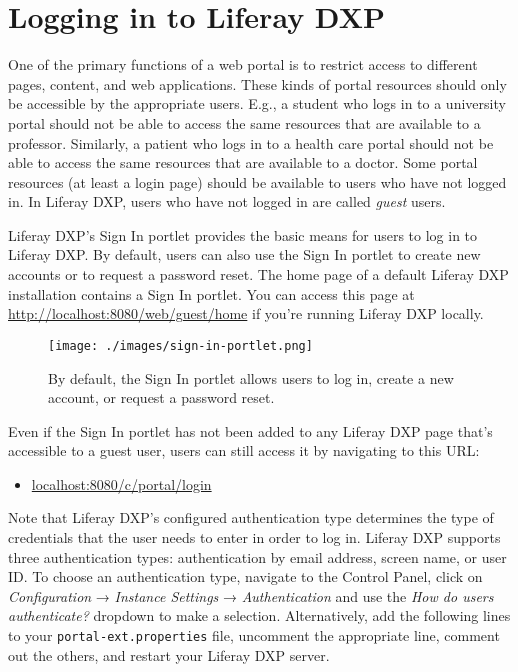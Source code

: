 \section{Logging in to Liferay DXP}\label{logging-in-to-liferay-dxp}

One of the primary functions of a web portal is to restrict access to
different pages, content, and web applications. These kinds of portal
resources should only be accessible by the appropriate users. E.g., a
student who logs in to a university portal should not be able to access
the same resources that are available to a professor. Similarly, a
patient who logs in to a health care portal should not be able to access
the same resources that are available to a doctor. Some portal resources
(at least a login page) should be available to users who have not logged
in. In Liferay DXP, users who have not logged in are called \emph{guest}
users.

Liferay DXP's Sign In portlet provides the basic means for users to log
in to Liferay DXP. By default, users can also use the Sign In portlet to
create new accounts or to request a password reset. The home page of a
default Liferay DXP installation contains a Sign In portlet. You can
access this page at \url{http://localhost:8080/web/guest/home} if you're
running Liferay DXP locally.

\begin{figure}
\centering
\texttt{[image: ./images/sign-in-portlet.png]}
\caption{By default, the Sign In portlet allows users to log in, create
a new account, or request a password reset.}
\end{figure}

Even if the Sign In portlet has not been added to any Liferay DXP page
that's accessible to a guest user, users can still access it by
navigating to this URL:

\begin{itemize}
\tightlist
\item
  \url{localhost:8080/c/portal/login}
\end{itemize}

Note that Liferay DXP's configured authentication type determines the
type of credentials that the user needs to enter in order to log in.
Liferay DXP supports three authentication types: authentication by email
address, screen name, or user ID. To choose an authentication type,
navigate to the Control Panel, click on \emph{Configuration} →
\emph{Instance Settings} → \emph{Authentication} and use the \emph{How
do users authenticate?} dropdown to make a selection. Alternatively, add
the following lines to your \texttt{portal-ext.properties} file,
uncomment the appropriate line, comment out the others, and restart your
Liferay DXP server.

